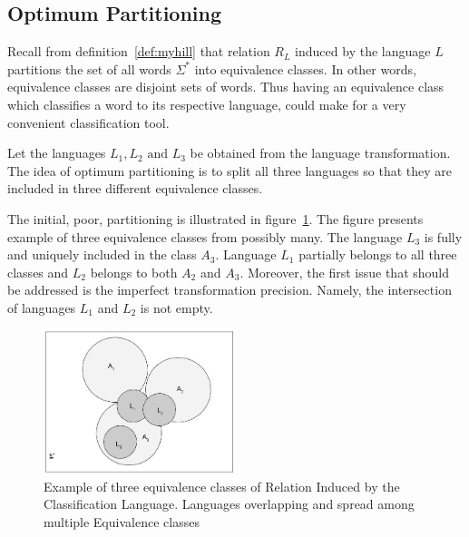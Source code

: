 \documentclass{mini}
\begin{document}
\subsection{Optimum Partitioning}\label{sec:lan_theory_class_lan_opt_part}

Recall from definition~\ref{def:myhill} that relation $R_L$ induced by the language $L$ partitions the set of all words $\Sigma^{*}$ into equivalence classes. In other words, equivalence classes are disjoint sets of words. Thus having an equivalence class which classifies a word to its respective language, could make for a very convenient classification tool.

Let the languages $L_{1}, L_{2} \text{ and } L_{3}$ be obtained from the language transformation. The idea of optimum partitioning is to split all three languages so that they are included in three different equivalence classes. 

The initial, poor, partitioning is illustrated in figure~\ref{fig:eq_classes_small_precision}. The figure presents example of three equivalence classes from possibly many. The language $L_{3}$ is fully and uniquely included in the class $A_{3}$. Language $L_{1}$ partially belongs to all three classes and $L_{2}$ belongs to both $A_{2}$ and $A_{3}$. Moreover, the first issue that should be addressed is the imperfect transformation precision. Namely, the intersection of languages $L_{1}$ and $L_{2}$ is not empty.

\begin{figure}[H]
    \centering
    \includegraphics[width=0.5\textwidth]{./images/equivalence_classes_small_pt.jpg}
    \caption{Example of three equivalence classes of Relation Induced by the Classification Language. Languages overlapping and spread among multiple Equivalence classes}
    \label{fig:eq_classes_small_precision}
\end{figure}
\end{document}
